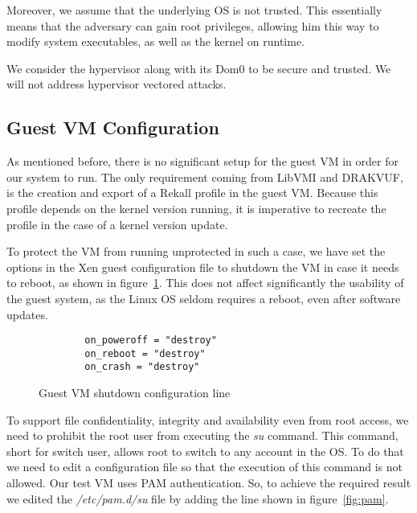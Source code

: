 \par Moreover, we assume that the underlying \ac{OS} is not trusted. This essentially means that the adversary can gain root privileges, allowing him this way to modify system executables, as well as the kernel on runtime.

\par We consider the hypervisor along with its Dom0 to be secure and trusted. We will not address hypervisor vectored attacks.

\subsection{Guest \ac{VM} Configuration}\label{sub:conf}

As mentioned before, there is no significant setup for the guest \ac{VM} in order for our system to run. The only requirement coming from LibVMI and DRAKVUF, is the creation and export of a Rekall profile in the guest \ac{VM}. Because this profile depends on the kernel version running, it is imperative to recreate the profile in the case of a kernel version update. 
\par To protect the \ac{VM} from running unprotected in such a case, we have set the options in the Xen guest configuration file to shutdown the \ac{VM} in case it needs to reboot, as shown in figure~\ref{fig:conf}. This does not affect significantly the usability of the guest system, as the Linux \ac{OS} seldom requires a reboot, even after software updates.

\begin{figure}[ht]
	\centering
	\begin{lstlisting}
		on_poweroff = "destroy"
		on_reboot = "destroy"
		on_crash = "destroy"
	\end{lstlisting}
	\caption{Guest \ac{VM} shutdown configuration line}
	\label{fig:conf}
\end{figure}

\par To support file confidentiality, integrity and availability even from root access, we need to prohibit the root user from executing the \textit{su} command. This command, short for switch user, allows root to switch to any account in the \ac{OS}. To do that we need to edit a configuration file so that the execution of this command is not allowed. Our test \ac{VM} uses \ac{PAM} authentication. So, to achieve the required result we edited the \textit{/etc/pam.d/su} file by adding the line shown in figure~\ref{fig:pam}.

